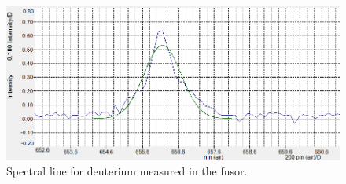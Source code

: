 \begin{figure}
	\centering
	\includegraphics[width=\textwidth]{Figures/D_linje.png}
	\caption{Spectral line for deuterium measured in the fusor.}
	\label{fig:Spectro}
\end{figure}

